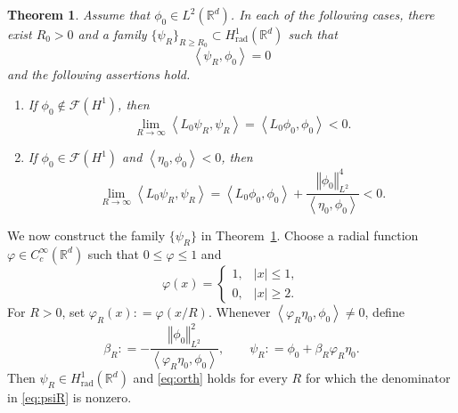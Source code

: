 \documentclass[12pt, a4paper, reqno]{amsart}
\numberwithin{equation}{section}
\newtheorem{theorem}{Theorem}[section]
\theoremstyle{definition}
\theoremstyle{remark}
\newcommand{\R}{\mathbb R}
\newcommand{\cF}{\mathcal F}
\def\tbra[#1,#2]{{\left\langle #1,#2\right\rangle}}
\def\norm[#1]{{\left\Vert #1 \right\Vert}}
\newcommand{\rad}{\mathrm{rad}}
\newcommand{\ce}{\mathrel{\mathop:}=}
\begin{document}
\begin{theorem}\label{thm:dir}
Assume that $\phi_0\in L^2(\R^d)$.
In each of the following cases, there
exist $R_0>0$ and a family
$\{\psi_R\}_{R\ge R_0}\subset H_{\rad}^1(\R^d)$ such that
\begin{equation}\label{eq:orth}
  \tbra[\psi_R,\phi_0]=0
\end{equation}
and the following assertions hold.
\begin{enumerate}
\item If $\phi_0\notin\cF(H^1)$, then
\begin{equation}\label{eq:lim-nw}
  \lim_{R\to\infty}\tbra[L_0\psi_R,\psi_R]
  =\tbra[L_0\phi_0,\phi_0]<0.
\end{equation}

\item If $\phi_0\in\cF(H^1)$ and
$\tbra[\eta_0,\phi_0]<0$, then
\begin{equation}\label{eq:lim-w}
  \lim_{R\to\infty}\tbra[L_0\psi_R,\psi_R]
  =\tbra[L_0\phi_0,\phi_0]
   +\frac{\norm[\phi_0]_{L^2}^4}{\tbra[\eta_0,\phi_0]}
  <0.
\end{equation}
\end{enumerate}
\end{theorem}

We now construct the family $\{\psi_R\}$ in Theorem~\ref{thm:dir}.
Choose a radial function $\varphi\in C_c^\infty(\R^d)$ such that
$0\le\varphi\le1$ and
\[
  \varphi(x)
  =\begin{cases}
    1, & |x|\le1,\\
    0, & |x|\ge2.
  \end{cases}
\]
For $R>0$, set $\varphi_R(x)\ce \varphi(x/R)$. Whenever
$\tbra[\varphi_R\eta_0,\phi_0]\ne0$, define
\begin{equation}\label{eq:psiR}
  \beta_R
  \ce -\frac{\norm[\phi_0]_{L^2}^2}
          {\tbra[\varphi_R\eta_0,\phi_0]},
  \qquad
  \psi_R\ce \phi_0+\beta_R\varphi_R\eta_0.
\end{equation}
Then $\psi_R\in H_{\rad}^1(\R^d)$ and
\eqref{eq:orth} holds for every $R$ for which the denominator
in \eqref{eq:psiR} is nonzero.
\end{document}
